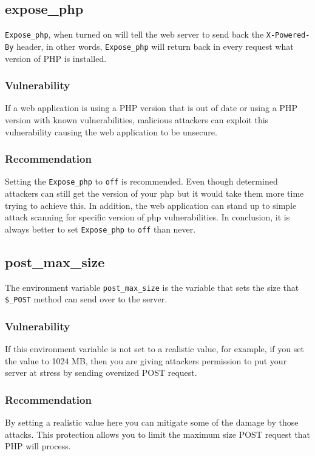 \documentclass[conference]{IEEEtran}
\begin{document}
\subsection{expose\_php}
\texttt{Expose\_php}, when turned on will tell the web server to send back the \texttt{X-Powered-By} header, in other words, \texttt{Expose\_php} will return back in every request what version of PHP is installed.
\subsubsection{Vulnerability}
If a web application is using a PHP version that is out of date or using a PHP version with known vulnerabilities, malicious attackers can exploit this vulnerability causing the web application to be 
unsecure\cite{exposephp}.
\subsubsection{Recommendation}
Setting the \texttt{Expose\_php} to \texttt{off} is recommended. Even though determined attackers can still get the version of your php but it would take them more time trying to achieve this. In addition,
 the web application can stand up to simple attack scanning for specific version of php vulnerabilities. In conclusion, it is always better to set \texttt{Expose\_php} to \texttt{off} than never.
 
\subsection{post\_max\_size}
The environment variable \texttt{post\_max\_size} is the variable that sets the size that \texttt{\$\_POST} method can send over to the server.
\subsubsection{Vulnerability}
If this environment variable is not set to a realistic value, for example, if you set the value to 1024 MB, then you are giving attackers permission to put your server at stress by sending oversized POST request.\cite{postmaxsize}
\subsubsection{Recommendation}
By setting a realistic value here you can mitigate some of the damage by those attacks. This protection allows you to limit the maximum size POST request that PHP will process.
\end{document}
